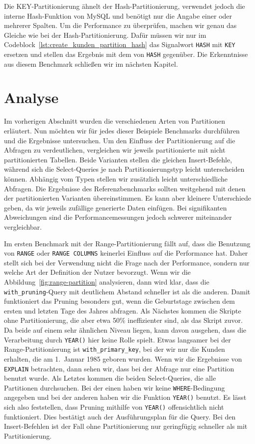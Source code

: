 Die KEY-Partitionierung ähnelt der Hash-Partitionierung, verwendet jedoch die interne Hash-Funktion von MySQL und benötigt nur die Angabe einer oder mehrerer Spalten.
Um die Performance zu überprüfen, machen wir genau das Gleiche wie bei der Hash-Partitionierung.
Dafür müssen wir nur im Codeblock~\ref{lst:create_kunden_partition_hash} das Signalwort \texttt{HASH} mit \texttt{KEY} ersetzen und stellen das Ergebnis mit dem von \texttt{HASH} gegenüber.
Die Erkenntnisse aus diesem Benchmark schließen wir im nächsten Kapitel.

\section{Analyse}\label{sec:partition-analyse}

Im vorherigen Abschnitt wurden die verschiedenen Arten von Partitionen erläutert.
Nun möchten wir für jedes dieser Beispiele Benchmarks durchführen und die Ergebnisse untersuchen.
Um den Einfluss der Partitionierung auf die Abfragen zu verdeutlichen, vergleichen wir jeweils partitionierte mit nicht partitionierten Tabellen.
Beide Varianten stellen die gleichen Insert-Befehle, während sich die Select-Queries je nach Partitionierungstyp leicht unterscheiden können.
Abhängig vom Typen stellen wir zusätzlich leicht unterschiedliche Abfragen.
Die Ergebnisse des Referenzbenchmarks sollten weitgehend mit denen der partitionierten Varianten übereinstimmen.
Es kann aber kleinere Unterschiede geben, da wir jeweils zufällige generierte Daten einfügen.
Bei signifikanten Abweichungen sind die Performancemessungen jedoch schwerer miteinander vergleichbar.

Im ersten Benchmark mit der Range-Partitionierung fällt auf, dass die Benutzung von \texttt{RANGE} oder \texttt{RANGE COLUMNS} keinerlei Einfluss auf die Performance hat.
Daher stellt sich bei der Verwendung nicht die Frage nach der Performance, sondern nur welche Art der Definition der Nutzer bevorzugt.
Wenn wir die Abbildung~\ref{fig:range-partition} analysieren, dann wird klar, dass die \texttt{with\_pruning}-Query mit deutlichem Abstand schneller ist als die anderen.
Damit funktioniert das Pruning besonders gut, wenn die Geburtstage zwischen dem ersten und letzten Tage des Jahres abfragen.
Als Nächstes kommen die Skripte ohne Partitionierung, die aber etwa 50\% ineffizienter sind, als das Skript zuvor.
Da beide auf einem sehr ähnlichen Niveau liegen, kann davon ausgehen, dass die Verarbeitung durch \texttt{YEAR()} hier keine Rolle spielt.
Etwas langsamer bei der Range-Partitionierung ist \texttt{with\_primary\_key}, bei der wir nur die Kunden erhalten, die am 1.\ Januar 1985 geboren wurden.
Wenn wir die Ergebnisse von \texttt{EXPLAIN} betrachten, dann sehen wir, dass bei der Abfrage nur eine Partition benutzt wurde.
Als Letztes kommen die beiden Select-Queries, die alle Partitionen durchsuchen.
Bei der einen haben wir keine \texttt{WHERE}-Bedingung angegeben und bei der anderen haben wir die Funktion \texttt{YEAR()} benutzt.
Es lässt sich also feststellen, dass Pruning mithilfe von \texttt{YEAR()} offensichtlich nicht funktioniert.
Dies bestätigt auch der Ausführungsplan für die Query.
Bei den Insert-Befehlen ist der Fall ohne Partitionierung nur geringfügig schneller als mit Partitionierung.

